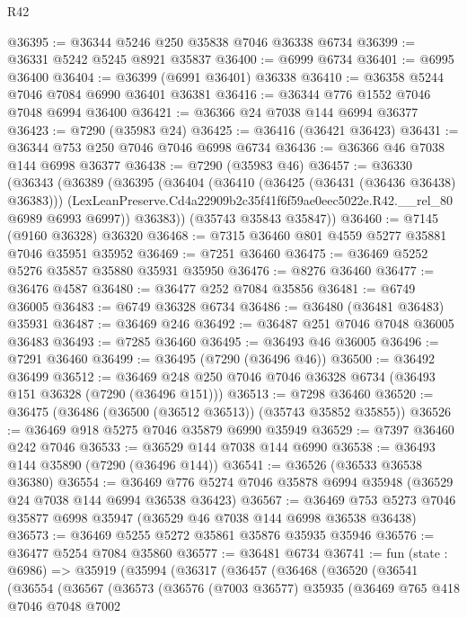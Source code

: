 \begin{lexlean}{R42}
\begin{coremodule}
{@36395 := @36344 @5246 @250 @35838 @7046 @36338 @6734
@36399 := @36331 @5242 @5245 @8921 @35837
@36400 := @6999 @6734
@36401 := @6995 @36400
@36404 := @36399 (@6991 @36401) @36338
@36410 := @36358 @5244 @7046 @7084 @6990 @36401 @36381
@36416 := @36344 @776 @1552 @7046 @7048 @6994 @36400
@36421 := @36366 @24 @7038 @144 @6994 @36377
@36423 := @7290 (@35983 @24)
@36425 := @36416 (@36421 @36423)
@36431 := @36344 @753 @250 @7046 @7046 @6998 @6734
@36436 := @36366 @46 @7038 @144 @6998 @36377
@36438 := @7290 (@35983 @46)
@36457 := @36330
    (@36343
      (@36389
        (@36395
          (@36404
            (@36410 (@36425 (@36431 (@36436 @36438) @36383)))
            (LexLeanPreserve.Cd4a22909b2c35f41f6f59ae0eec5022e.R42.__rel_80 @6989 @6993 @6997))
          @36383))
      (@35743 @35843 @35847))
@36460 := @7145 (@9160 @36328) @36320
@36468 := @7315 @36460 @801 @4559 @5277 @35881 @7046 @35951 @35952
@36469 := @7251 @36460
@36475 := @36469 @5252 @5276 @35857 @35880 @35931 @35950
@36476 := @8276 @36460
@36477 := @36476 @4587
@36480 := @36477 @252 @7084 @35856
@36481 := @6749 @36005
@36483 := @6749 @36328 @6734
@36486 := @36480 (@36481 @36483) @35931
@36487 := @36469 @246
@36492 := @36487 @251 @7046 @7048 @36005 @36483
@36493 := @7285 @36460
@36495 := @36493 @46 @36005
@36496 := @7291 @36460
@36499 := @36495 (@7290 (@36496 @46))
@36500 := @36492 @36499
@36512 := @36469 @248 @250 @7046 @7046 @36328 @6734 (@36493 @151 @36328 (@7290 (@36496 @151)))
@36513 := @7298 @36460
@36520 := @36475 (@36486 (@36500 (@36512 @36513)) (@35743 @35852 @35855))
@36526 := @36469 @918 @5275 @7046 @35879 @6990 @35949
@36529 := @7397 @36460 @242 @7046
@36533 := @36529 @144 @7038 @144 @6990
@36538 := @36493 @144 @35890 (@7290 (@36496 @144))
@36541 := @36526 (@36533 @36538 @36380)
@36554 := @36469 @776 @5274 @7046 @35878 @6994 @35948 (@36529 @24 @7038 @144 @6994 @36538 @36423)
@36567 := @36469 @753 @5273 @7046 @35877 @6998 @35947 (@36529 @46 @7038 @144 @6998 @36538 @36438)
@36573 := @36469 @5255 @5272 @35861 @35876 @35935 @35946
@36576 := @36477 @5254 @7084 @35860
@36577 := @36481 @6734
@36741 := fun (state : @6986) =>
  @35919
    (@35994
      (@36317
        (@36457
          (@36468
            (@36520
              (@36541
                (@36554
                  (@36567
                    (@36573
                      (@36576
                        (@7003 @36577)
                        @35935
                        (@36469
                          @765
                          @418
                          @7046
                          @7048
                          @7002
}
\end{coremodule}
\end{lexlean}

